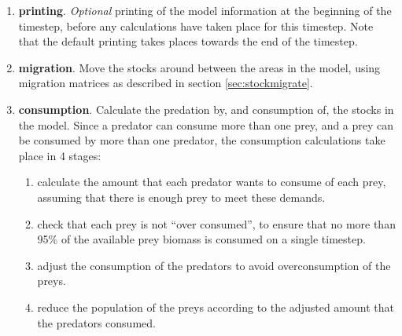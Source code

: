 \documentclass[]{book}
\begin{document}
\begin{enumerate}
\def\labelenumi{\arabic{enumi}.}
\item
  \textbf{printing}. \emph{Optional} printing of the model information at the
  beginning of the timestep, before any calculations have taken place
  for this timestep. Note that the default printing takes places
  towards the end of the timestep.
\item
  \textbf{migration}. Move the stocks around between the areas in the
  model, using migration matrices as described in
  section \ref{sec:stockmigrate}.
\item
  \textbf{consumption}. Calculate the predation by, and consumption of, the
  stocks in the model. Since a predator can consume more than one
  prey, and a prey can be consumed by more than one predator, the
  consumption calculations take place in 4 stages:

  \begin{enumerate}
  \def\labelenumii{\arabic{enumii}.}
  \item
    calculate the amount that each predator wants to consume of each
    prey, assuming that there is enough prey to meet these demands.
  \item
    check that each prey is not ``over consumed'', to ensure that no
    more than 95\% of the available prey biomass is consumed on a
    single timestep.
  \item
    adjust the consumption of the predators to avoid overconsumption
    of the preys.
  \item
    reduce the population of the preys according to the adjusted
    amount that the predators consumed.
  \end{enumerate}


\end{enumerate}
\end{document}
